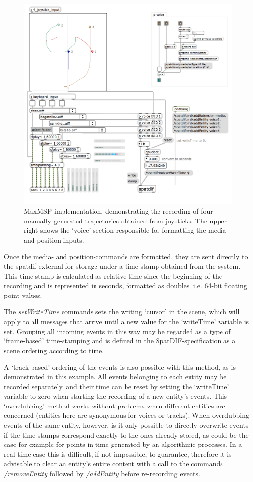 \documentclass{article}
\begin{document}
\begin{figure}[httb]
	\centering
	\includegraphics[width=\columnwidth]{recording_maxpatch.png}
	\caption{MaxMSP implementation, demonstrating the recording of four manually generated trajectories obtained from joysticks. The upper right shows the `voice' section responsible for formatting the media and position inputs.} 
	\label{fig:screenshot2}
\end{figure}

Once the media- and position-commands are formatted, they are sent directly to the spatdif-external for storage under a time-stamp obtained from the system.
This time-stamp is calculated as relative time since the beginning of the recording and is represented in seconds, formatted as doubles, i.e. 64-bit floating point values.

The \emph{setWriteTime} commands sets the writing `cursor' in the scene, which will apply to all messages that arrive until a new value for the `writeTime' variable is set.
Grouping all incoming events in this way may be regarded as a type of `frame-based' time-stamping and is defined in the SpatDIF-specification as a scene ordering according to time.

A `track-based' ordering of the events is also possible with this method, as is demonstrated in this example.
All events belonging to each entity may be recorded separately, and their time can be reset by setting the `writeTime' variable to zero when starting the recording of a new entity's events.
This `overdubbing' method works without problems when different entities are concerned (entities here are synonymous for voices or tracks).
When overdubbing events of the same entity, however, is it only possible to directly overwrite events if the time-stamps correspond exactly to the ones already stored, as could be the case for example for points in time generated by an algorithmic processes. 
In a real-time case this is difficult, if not impossible, to guarantee, therefore it is advisable to clear an entity's entire content with a call to the commands \emph{/removeEntity} followed by \emph{/addEntity} before re-recording events.
\end{document}
